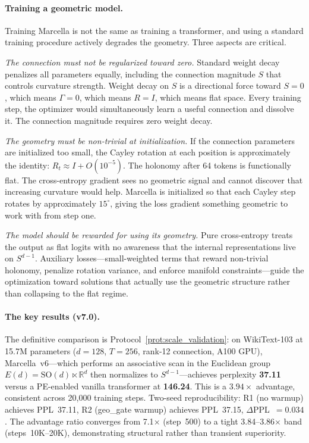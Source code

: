 \documentclass[11pt,a4paper]{article}
\theoremstyle{definition}
\theoremstyle{remark}
\begin{document}
\paragraph{Training a geometric model.}
Training Marcella is not the same as training a transformer, and using a standard training procedure actively degrades the geometry. Three aspects are critical.

\emph{The connection must not be regularized toward zero.} Standard weight decay penalizes all parameters equally, including the connection magnitude $S$ that controls curvature strength. Weight decay on $S$ is a directional force toward $S = 0$, which means $\Gamma = 0$, which means $R = I$, which means flat space. Every training step, the optimizer would simultaneously learn a useful connection and dissolve it. The connection magnitude requires zero weight decay.

\emph{The geometry must be non-trivial at initialization.} If the connection parameters are initialized too small, the Cayley rotation at each position is approximately the identity: $R_t \approx I + O(10^{-5})$. The holonomy after 64 tokens is functionally flat. The cross-entropy gradient sees no geometric signal and cannot discover that increasing curvature would help. Marcella is initialized so that each Cayley step rotates by approximately $15^\circ$, giving the loss gradient something geometric to work with from step one.

\emph{The model should be rewarded for using its geometry.} Pure cross-entropy treats the output as flat logits with no awareness that the internal representations live on $S^{d-1}$. Auxiliary losses---small-weighted terms that reward non-trivial holonomy, penalize rotation variance, and enforce manifold constraints---guide the optimization toward solutions that actually use the geometric structure rather than collapsing to the flat regime.

\paragraph{The key results (v7.0).}
The definitive comparison is Protocol~\ref{prot:scale_validation}: on WikiText-103 at 15.7M parameters ($d = 128$, $T = 256$, rank-12 connection, A100 GPU), Marcella~v6---which performs an associative scan in the Euclidean group $E(d) = \mathrm{SO}(d) \ltimes \mathbb{R}^d$ then normalizes to $S^{d-1}$---achieves perplexity \textbf{37.11} versus a PE-enabled vanilla transformer at \textbf{146.24}. This is a $\mathbf{3.94\times}$ advantage, consistent across 20,000 training steps. Two-seed reproducibility: R1 (no warmup) achieves PPL~37.11, R2 (geo\_gate warmup) achieves PPL~37.15, $\Delta$PPL~$= 0.034$. The advantage ratio converges from 7.1$\times$ (step~500) to a tight 3.84--3.86$\times$ band (steps~10K--20K), demonstrating structural rather than transient superiority.
\end{document}
